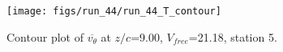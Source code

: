 \begin{figure}[H]
\centering
\texttt{[image: figs/run\_44/run\_44\_T\_contour]}
\caption{Contour plot of $\overline{v_{\theta}}$ at $z/c$=9.00, $V_{free}$=21.18, station 5.}
\label{fig:run_44_T_contour}
\end{figure}


